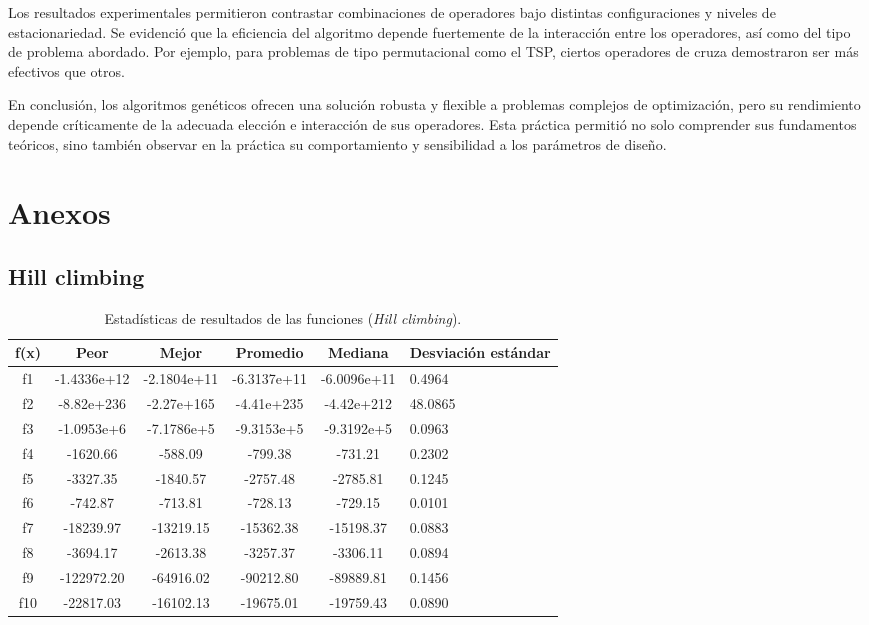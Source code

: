 \documentclass[12pt,twoside]{report}
\begin{document}
	Los resultados experimentales permitieron contrastar combinaciones de operadores bajo distintas configuraciones y niveles de estacionariedad. Se evidenció que la eficiencia del algoritmo depende fuertemente de la interacción entre los operadores, así como del tipo de problema abordado. Por ejemplo, para problemas de tipo permutacional como el TSP, ciertos operadores de cruza demostraron ser más efectivos que otros.
	
	En conclusión, los algoritmos genéticos ofrecen una solución robusta y flexible a problemas complejos de optimización, pero su rendimiento depende críticamente de la adecuada elección e interacción de sus operadores. Esta práctica permitió no solo comprender sus fundamentos teóricos, sino también observar en la práctica su comportamiento y sensibilidad a los parámetros de diseño.
	
	
	
	\clearpage
	
	
	
	\clearpage
	\chapter{Anexos}
	
	\section{Hill climbing}
	
	\begin{table}[H]
		\centering
		\begin{tabular}{|c|c|c|c|c|p{2.1cm}|}  
			\hline
			\textbf{f(x)} & \textbf{Peor} & \textbf{Mejor} & \textbf{Promedio} & \textbf{Mediana} & \textbf{Desviación estándar} \\  
			\hline
			f1  & -1.4336e+12 & -2.1804e+11 & -6.3137e+11 & -6.0096e+11 & 0.4964 \\
			f2  & -8.82e+236  & -2.27e+165  & -4.41e+235  & -4.42e+212  & 48.0865 \\
			f3  & -1.0953e+6  & -7.1786e+5  & -9.3153e+5  & -9.3192e+5  & 0.0963 \\
			f4  & -1620.66     & -588.09     & -799.38     & -731.21     & 0.2302 \\
			f5  & -3327.35     & -1840.57    & -2757.48    & -2785.81    & 0.1245 \\
			f6  & -742.87      & -713.81     & -728.13     & -729.15     & 0.0101 \\
			f7  & -18239.97    & -13219.15   & -15362.38   & -15198.37   & 0.0883 \\
			f8  & -3694.17     & -2613.38    & -3257.37    & -3306.11    & 0.0894 \\
			f9  & -122972.20   & -64916.02   & -90212.80   & -89889.81   & 0.1456 \\
			f10 & -22817.03    & -16102.13   & -19675.01   & -19759.43   & 0.0890 \\
			\hline
		\end{tabular}
		\caption{Estadísticas de resultados de las funciones (\textit{Hill climbing}).}
		\label{tab:res_hc}
	\end{table}
	
\end{document}
